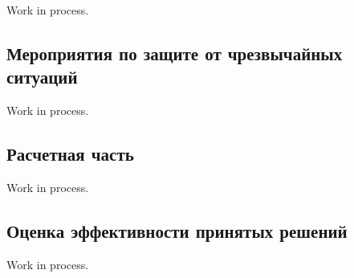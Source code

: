 Work in process.

\subsection{Мероприятия по защите от чрезвычайных ситуаций}

Work in process.

\subsection{Расчетная часть}

Work in process.

\subsection{Оценка эффективности принятых решений}

Work in process.

\clearpage
\newpage